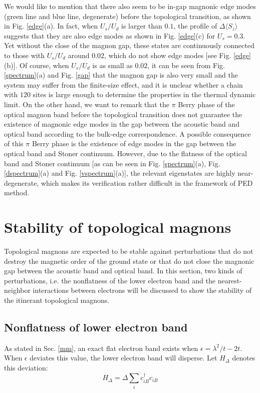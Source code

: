 \documentclass[amsmath,superscriptaddress,showpacs,aps,prb,twocolumn]{revtex4-1}
\begin{document}
\par We would like to mention that there also seem to be in-gap magnonic edge modes (green line and blue line, degenerate) before the topological transition, as shown in Fig. \ref{edge}(a). In fact, when $U_s/U_d$ is larger than $0.1$, the profile of $\Delta\langle S_z\rangle$ suggests that they are also edge modes as shown in Fig. \ref{edge}(c) for $U_s=0.3$. Yet without the close of the magnon gap, these states are continuously connected to those with $U_s/U_d$ around $0.02$, which do not show edge modes [see Fig. \ref{edge}(b)]. Of course, when $U_s/U_d$ is as small as $0.02$, it can be seen from Fig. \ref{spectrum}(a) and Fig. \ref{gap} that the magnon gap is also very small and the system may suffer from the finite-size effect, and it is unclear whether a chain with $120$ sites is large enough to determine the properties in the thermal dynamic limit. On the other hand, we want to remark that the $\pi$ Berry phase of the optical magnon band before the topological transition does not guarantee the existence of magnonic edge modes in the gap between the acoustic band and optical band according to the bulk-edge correspondence. A possible consequence of this $\pi$ Berry phase is the existence of edge modes in the gap between the optical band and Stoner continuum. However, due to the flatness of the optical band and Stoner continuum [as can be seen in Fig. \ref{spectrum}(a), Fig. \ref{dspectrum}(a) and Fig. \ref{vspectrum}(a)], the relevant eigenstates are highly near-degenerate, which makes its verification rather difficult in the framework of PED method.

\section{Stability of topological magnons}\label{stm}
\par Topological magnons are expected to be stable against perturbations that do not destroy the magnetic order of the ground state or that do not close the magnonic gap between the acoustic band and optical band. In this section, two kinds of perturbations, i.e. the nonflatness of the lower electron band and the nearest-neighbor interactions between electrons will be discussed to show the stability of the itinerant topological magnons.

\subsection{Nonflatness of lower electron band}
\par As stated in Sec. \ref{mm}, an exact flat electron band exists when $\epsilon=\lambda^2/t-2t$. When $\epsilon$ deviates this value, the lower electron band will disperse. Let $H_\Delta$ denotes this deviation:
\begin{equation}\label{delta}
H_{\Delta}=\Delta\sum_ic_{iB}^\dagger c_{iB}
\end{equation}
\end{document}
